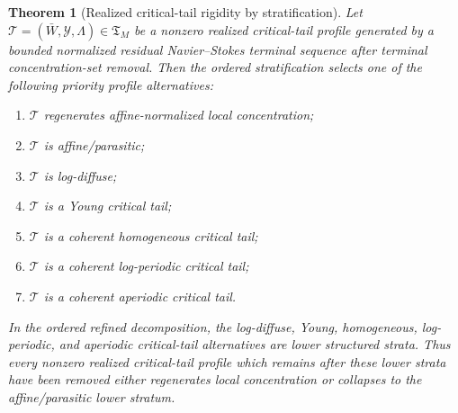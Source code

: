 \documentclass[11pt]{amsart}
\numberwithin{equation}{section}
\theoremstyle{plain}
\newtheorem{theorem}{Theorem}[section]
\theoremstyle{definition}
\theoremstyle{remark}
\newcommand{\Tcrit}{\mathfrak T_M}
\begin{document}
\begin{theorem}[Realized critical-tail rigidity by stratification]
\label{thm:realized-critical-tail-rigidity}
Let \(\mathcal T=(\bar W,\mathcal Y,\Lambda)\in\Tcrit\) be a nonzero realized
critical-tail profile generated by a bounded normalized residual Navier--Stokes
terminal sequence after terminal concentration-set removal.  Then the ordered
stratification selects one of the following priority profile alternatives:
\begin{enumerate}[label=\textup{(\alph*)}]
   \item \(\mathcal T\) regenerates affine-normalized local concentration;
   \item \(\mathcal T\) is affine/parasitic;
   \item \(\mathcal T\) is log-diffuse;
   \item \(\mathcal T\) is a Young critical tail;
   \item \(\mathcal T\) is a coherent homogeneous critical tail;
   \item \(\mathcal T\) is a coherent log-periodic critical tail;
   \item \(\mathcal T\) is a coherent aperiodic critical tail.
\end{enumerate}
In the ordered refined decomposition, the log-diffuse, Young, homogeneous,
log-periodic, and aperiodic critical-tail alternatives are lower structured strata.
Thus every nonzero realized critical-tail profile which remains after these
lower strata have been removed either regenerates local concentration or collapses
to the affine/parasitic lower stratum.
\end{theorem}
\end{document}
